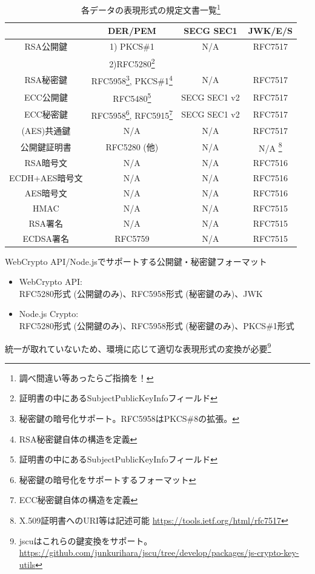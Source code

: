 \documentclass[12pt,dvipdfmx]{beamer}
\begin{document}
\begin{frame}
\begin{center}
\begin{table}
\scriptsize
\caption{\footnotesize 各データの表現形式の規定文書一覧\footnote[frame]{\scriptsize \alert{調べ間違い等あったらご指摘を！}}}
\begin{tabular}{|c|c|c|c|}
\hline
& DER/PEM & SECG SEC1 & JWK/E/S \\
\hline
\hline
RSA公開鍵 & 1) PKCS\#1 & N/A & RFC7517 \\
 & 2)RFC5280\footnote[frame]{\scriptsize 証明書の中にあるSubjectPublicKeyInfoフィールド} & & \\
\hline
RSA秘密鍵 & RFC5958\footnote[frame]{\scriptsize 秘密鍵の暗号化サポート。RFC5958はPKCS\#8の拡張。}, PKCS\#1\footnote[frame]{\scriptsize RSA秘密鍵自体の構造を定義} & N/A & RFC7517 \\
\hline
ECC公開鍵 & RFC5480\footnote[frame]{\scriptsize 証明書の中にあるSubjectPublicKeyInfoフィールド} & SECG SEC1 v2 & RFC7517 \\
\hline
ECC秘密鍵 & RFC5958\footnote[frame]{\scriptsize 秘密鍵の暗号化をサポートするフォーマット}, RFC5915\footnote[frame]{\scriptsize ECC秘密鍵自体の構造を定義} & SECG SEC1 v2 & RFC7517 \\
\hline
(AES)共通鍵 & N/A & N/A & RFC7517 \\
\hline
公開鍵証明書 & RFC5280 (他) & N/A & N/A \footnote[frame]{\scriptsize X.509証明書へのURI等は記述可能 \url{https://tools.ietf.org/html/rfc7517}} \\
\hline
RSA暗号文 & N/A & N/A & RFC7516\\
\hline
ECDH+AES暗号文 & N/A & N/A & RFC7516\\
\hline
AES暗号文 & N/A & N/A & RFC7516 \\
\hline
HMAC & N/A & N/A & RFC7515\\
\hline
RSA署名 & N/A & N/A & RFC7515\\
\hline
ECDSA署名 & RFC5759 & N/A & RFC7515\\
\hline
\end{tabular}
\end{table}
\end{center}
\end{frame}


\begin{frame}
\begin{exampleblock}{\small WebCrypto API/Node.jsでサポートする公開鍵・秘密鍵フォーマット}
\begin{itemize}
 \item WebCrypto API: \\RFC5280形式 (公開鍵のみ)、RFC5958形式 (秘密鍵のみ)、JWK
 \item Node.js Crypto: \\RFC5280形式 (公開鍵のみ)、RFC5958形式 (秘密鍵のみ)、PKCS\#1形式
\end{itemize}
\end{exampleblock}
統一が取れていないため、環境に応じて適切な表現形式の変換が必要\footnote[frame]{\scriptsize jscuはこれらの鍵変換をサポート。\url{https://github.com/junkurihara/jscu/tree/develop/packages/js-crypto-key-utils}}
\end{frame}
\end{document}
